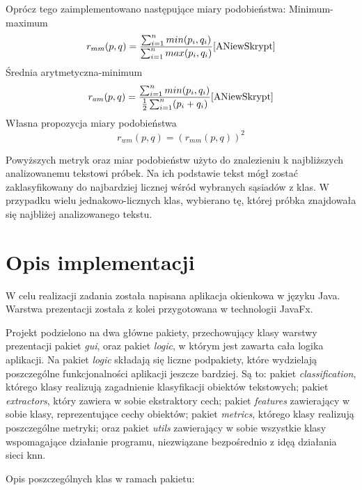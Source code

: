 \documentclass{classrep}
\begin{document}
Oprócz tego zaimplementowano następujące miary podobieństwa: \newline
Minimum-maximum
\begin{equation}
r_{mm}(p,q) = \frac{\sum_{i=1}^{n}min(p_{i},q_{i})}{\sum_{i=1}^{n}max(p_{i},q_{i})} \cite{ANiewSkrypt}
\end{equation}
Średnia arytmetyczna-minimum
\begin{equation}
r_{am}(p,q) = \frac{\sum_{i=1}^{n}min(p_{i},q_{i})}{\frac{1}{2}\sum_{i=1}^{n}(p_{i}+q_{i})} \cite{ANiewSkrypt}
\end{equation}
Własna propozycja miary podobieństwa
\begin{equation}
r_{wm}(p,q) = (r_{mm}(p,q))^{2}
\end{equation}

Powyższych metryk oraz miar podobieństw użyto do znalezieniu k najbliższych analizowanemu tekstowi próbek. Na ich podstawie tekst mógł zostać zaklasyfikowany do najbardziej licznej wśród wybranych sąsiadów z klas. W przypadku wielu jednakowo-licznych klas, wybierano tę, której próbka znajdowała się najbliżej analizowanego tekstu.

\section{Opis implementacji}

W celu realizacji zadania została napisana aplikacja okienkowa w języku Java. Warstwa prezentacji została z kolei przygotowana w technologii JavaFx\cite{JavaFX}.

Projekt podzielono na dwa główne pakiety, przechowujący klasy warstwy prezentacji pakiet \textit{gui}, oraz pakiet \textit{logic}, w którym jest zawarta cała logika aplikacji. Na pakiet \textit{logic} składają się liczne podpakiety, które wydzielają poszczególne funkcjonalności aplikacji jeszcze bardziej. Są to: pakiet \textit{classification}, którego klasy realizują zagadnienie klasyfikacji obiektów tekstowych; pakiet \textit{extractors}, który zawiera w sobie ekstraktory cech; pakiet \textit{features} zawierający w sobie klasy, reprezentujące cechy obiektów; pakiet \textit{metrics}, którego klasy realizują poszczególne metryki; oraz pakiet \textit{utils} zawierający w sobie wszystkie klasy wspomagające działanie programu, niezwiązane bezpośrednio z idęą działania sieci knn.

Opis poszczególnych klas w ramach pakietu:
\end{document}
